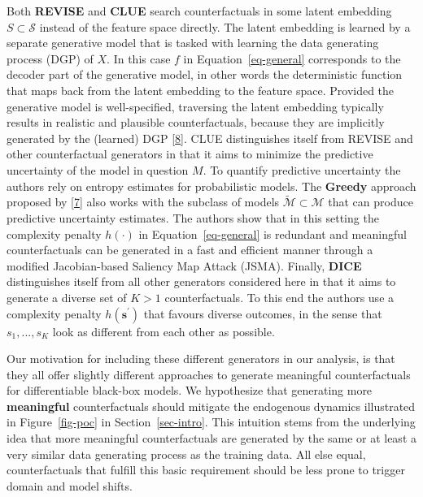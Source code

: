 \documentclass[
  conference]{IEEEtran}
\begin{document}
Both \textbf{REVISE} and \textbf{CLUE} search counterfactuals in some
latent embedding \(S \subset \mathcal{S}\) instead of the feature space
directly. The latent embedding is learned by a separate generative model
that is tasked with learning the data generating process (DGP) of \(X\).
In this case \(f\) in Equation~\ref{eq-general} corresponds to the
decoder part of the generative model, in other words the deterministic
function that maps back from the latent embedding to the feature space.
Provided the generative model is well-specified, traversing the latent
embedding typically results in realistic and plausible counterfactuals,
because they are implicitly generated by the (learned) DGP
\protect\hyperlink{ref-joshi2019towards}{{[}8{]}}. CLUE distinguishes
itself from REVISE and other counterfactual generators in that it aims
to minimize the predictive uncertainty of the model in question \(M\).
To quantify predictive uncertainty the authors rely on entropy estimates
for probabilistic models. The \textbf{Greedy} approach proposed by
\protect\hyperlink{ref-schut2021generating}{{[}7{]}} also works with the
subclass of models \(\tilde{\mathcal{M}}\subset\mathcal{M}\) that can
produce predictive uncertainty estimates. The authors show that in this
setting the complexity penalty \(h(\cdot)\) in Equation~\ref{eq-general}
is redundant and meaningful counterfactuals can be generated in a fast
and efficient manner through a modified Jacobian-based Saliency Map
Attack (JSMA). Finally, \textbf{DICE} distinguishes itself from all
other generators considered here in that it aims to generate a diverse
set of \(K>1\) counterfactuals. To this end the authors use a complexity
penalty \(h(\mathbf{s}^\prime)\) that favours diverse outcomes, in the
sense that \(s_1, ... , s_K\) look as different from each other as
possible.

Our motivation for including these different generators in our analysis,
is that they all offer slightly different approaches to generate
meaningful counterfactuals for differentiable black-box models. We
hypothesize that generating more \textbf{meaningful} counterfactuals
should mitigate the endogenous dynamics illustrated in
Figure~\ref{fig-poc} in Section~\ref{sec-intro}. This intuition stems
from the underlying idea that more meaningful counterfactuals are
generated by the same or at least a very similar data generating process
as the training data. All else equal, counterfactuals that fulfill this
basic requirement should be less prone to trigger domain and model
shifts.
\end{document}
